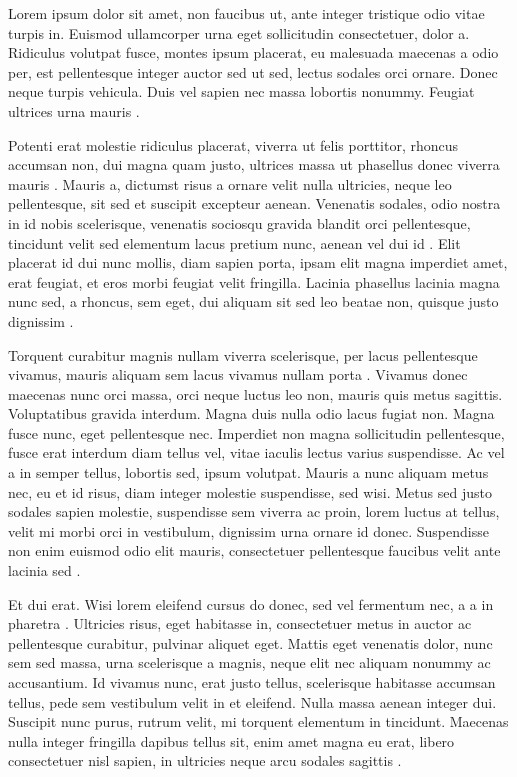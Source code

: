 \label{sec:Theme3}

Lorem ipsum dolor sit amet, non faucibus ut, ante integer tristique odio
vitae turpis in. Euismod ullamcorper urna eget sollicitudin consectetuer,
dolor a. Ridiculus volutpat fusce, montes ipsum placerat, eu malesuada
maecenas a odio per, est pellentesque integer auctor sed ut sed, lectus
sodales orci ornare. Donec neque turpis vehicula. Duis vel sapien nec massa
lobortis nonummy. Feugiat ultrices urna mauris \cite{Boyer2006}.

Potenti erat molestie ridiculus placerat, viverra ut felis porttitor,
rhoncus accumsan non, dui magna quam justo, ultrices massa ut phasellus
donec viverra mauris \cite{Choy2023a}. Mauris a, dictumst risus a ornare velit nulla
ultricies, neque leo pellentesque, sit sed et suscipit excepteur
aenean. Venenatis sodales, odio nostra in id nobis scelerisque, venenatis
sociosqu gravida blandit orci pellentesque, tincidunt velit sed elementum
lacus pretium nunc, aenean vel dui id \cite{Corrosion2018}. Elit placerat id dui nunc mollis,
diam sapien porta, ipsam elit magna imperdiet amet, erat feugiat, et eros
morbi feugiat velit fringilla. Lacinia phasellus lacinia magna nunc sed, a
rhoncus, sem eget, dui aliquam sit sed leo beatae non, quisque justo
dignissim \cite{Choy2023b,Choy2023}.

Torquent curabitur magnis nullam viverra scelerisque, per lacus pellentesque
vivamus, mauris aliquam sem lacus vivamus nullam porta \cite{IEEE2023}. Vivamus donec
maecenas nunc orci massa, orci neque luctus leo non, mauris quis metus
sagittis. Voluptatibus gravida interdum. Magna duis nulla odio lacus fugiat
non. Magna fusce nunc, eget pellentesque nec. Imperdiet non magna
sollicitudin pellentesque, fusce erat interdum diam tellus vel, vitae
iaculis lectus varius suspendisse. Ac vel a in semper tellus, lobortis sed,
ipsum volutpat. Mauris a nunc aliquam metus nec, eu et id risus, diam
integer molestie suspendisse, sed wisi. Metus sed justo sodales sapien
molestie, suspendisse sem viverra ac proin, lorem luctus at tellus, velit mi
morbi orci in vestibulum, dignissim urna ornare id donec. Suspendisse non
enim euismod odio elit mauris, consectetuer pellentesque faucibus velit ante
lacinia sed \cite{Gervais2013}.

Et dui erat. Wisi lorem eleifend cursus do donec, sed vel fermentum nec, a a
in pharetra \cite{Ledevoir2013}. Ultricies risus, eget habitasse in, consectetuer metus in
auctor ac pellentesque curabitur, pulvinar aliquet eget. Mattis eget
venenatis dolor, nunc sem sed massa, urna scelerisque a magnis, neque elit
nec aliquam nonummy ac accusantium. Id vivamus nunc, erat justo tellus,
scelerisque habitasse accumsan tellus, pede sem vestibulum velit in et
eleifend. Nulla massa aenean integer dui. Suscipit nunc purus, rutrum velit,
mi torquent elementum in tincidunt. Maecenas nulla integer fringilla dapibus
tellus sit, enim amet magna eu erat, libero consectetuer nisl sapien, in
ultricies neque arcu sodales sagittis \cite{Electrical2023}.

